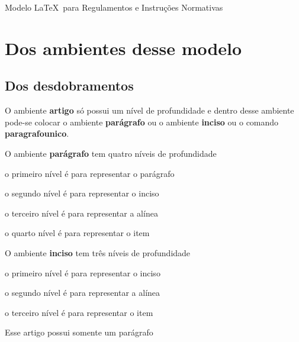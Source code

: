 \documentclass[11pt,twoside,a4paper]{inifsc}
\begin{document}
\begin{normativa}{Modelo \LaTeX~para Regulamentos e Instruções Normativas}
\chapter{Dos ambientes desse modelo}

\section{Dos desdobramentos}

\begin{artigo}
    \item O ambiente \textbf{artigo} só possui um nível de profundidade e dentro desse ambiente pode-se colocar o ambiente \textbf{parágrafo} ou o ambiente \textbf{inciso} ou o comando \textbf{paragrafounico}.
    \item\label{art:comparagrafoaserref}
    O ambiente \textbf{parágrafo} tem quatro níveis de profundidade
    \begin{paragrafo}
        \item\label{par:nivelparagrafo}
        o primeiro nível é para representar o parágrafo
        \begin{paragrafo}
            \item\label{inc:segnivelparagrafo}
             o segundo nível é para representar o inciso
            \begin{paragrafo}
                \item\label{ali:ternivelparagrafo}
                o terceiro nível é para representar a alínea
                \begin{paragrafo}
                    \item o quarto nível é para representar o item
                \end{paragrafo}
            \end{paragrafo}
        \end{paragrafo}
    \end{paragrafo}

    \item O ambiente \textbf{inciso} tem três níveis de profundidade
    \begin{inciso}
        \item o primeiro nível é para representar o inciso
        \begin{inciso}
            \item o segundo nível é para representar a alínea
            \begin{inciso}
                \item o terceiro nível é para representar o item
            \end{inciso}
        \end{inciso}
    \end{inciso}
    \item Esse artigo possui somente um parágrafo
\end{artigo}




\end{normativa}
\end{document}
